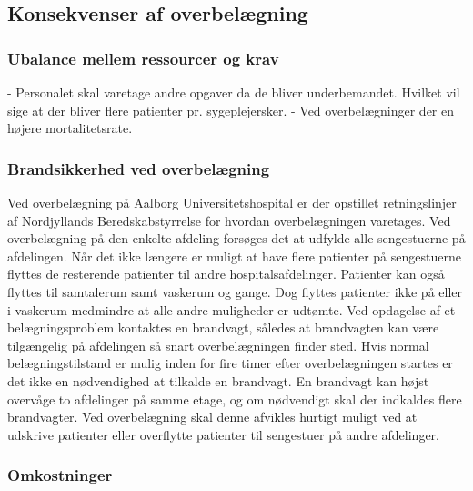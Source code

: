 \subsection{Konsekvenser af overbelægning}


\subsubsection{Ubalance mellem ressourcer og krav}
- Personalet skal varetage andre opgaver da de bliver underbemandet. Hvilket vil sige at der bliver flere patienter pr. sygeplejersker. 
- Ved overbelægninger der en højere mortalitetsrate. 




\subsubsection{Brandsikkerhed ved overbelægning}
Ved overbelægning på Aalborg Universitetshospital er der opstillet retningslinjer af Nordjyllands Beredskabstyrrelse for hvordan overbelægningen varetages. \citep{Beredskab2016} Ved overbelægning på den enkelte afdeling forsøges det at udfylde alle sengestuerne på afdelingen. Når det ikke længere er muligt at have flere patienter på sengestuerne flyttes de resterende patienter til andre hospitalsafdelinger. Patienter kan også flyttes til samtalerum samt vaskerum og gange. \citep{Beredskab2016} Dog flyttes patienter ikke på eller i vaskerum medmindre at alle andre muligheder er udtømte. 
Ved opdagelse af et belægningsproblem kontaktes en brandvagt, således at brandvagten kan være tilgængelig på afdelingen så snart overbelægningen finder sted. Hvis normal belægningstilstand er mulig inden for fire timer efter overbelægningen startes er det ikke en nødvendighed at tilkalde en brandvagt. En brandvagt kan højst overvåge to afdelinger på samme etage, og om nødvendigt skal der indkaldes flere brandvagter. \citep{Beredskab2016} Ved overbelægning skal denne afvikles hurtigt muligt ved at udskrive patienter eller overflytte patienter til sengestuer på andre afdelinger. 

\subsubsection{Omkostninger}











